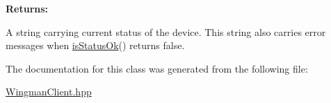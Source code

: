 \begin{Desc}
\item[{\bf Returns: }]\par
 A string carrying current status of the device. This string  also carries error messages when \hyperlink{class_WingmanClient_a14}{is\-Status\-Ok}() returns false. \end{Desc}


The documentation for this class was generated from the following file:\begin{CompactItemize}
\item 
\hyperlink{WingmanClient_hpp-source}{Wingman\-Client.hpp}\end{CompactItemize}
